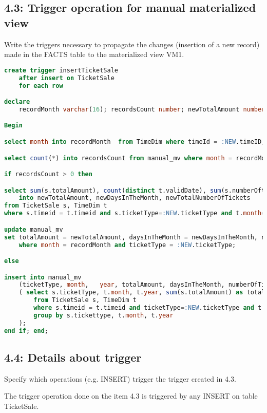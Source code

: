\subsection{4.3: Trigger operation for manual materialized view}
\begin{question}
    Write the triggers necessary to propagate the changes (insertion of a new record)
made in the FACTS table to the materialized view VM1.
\end{question}
\begin{answer}
    \begin{lstlisting}[language = SQL]
create trigger insertTicketSale
    after insert on TicketSale
    for each row

declare
    recordMonth varchar(16); recordsCount number; newTotalAmount number; newDaysInTheMonth number; newTotalNumberOfTickets number;

Begin

select month into recordMonth  from TimeDim where timeId = :NEW.timeID;

select count(*) into recordsCount from manual_mv where month = recordMonth and ticketType = :NEW.ticketType;

if recordsCount > 0 then

select sum(s.totalAmount), count(distinct t.validDate), sum(s.numberOftickets)
    into newTotalAmount, newDaysInTheMonth, newTotalNumberOfTickets
from TicketSale s, TimeDim t
where s.timeid = t.timeid and s.ticketType=:NEW.ticketType and t.month=recordMonth;

update manual_mv
set totalAmount = newTotalAmount, daysInTheMonth = newDaysInTheMonth, numberOfTickets = newTotalNumberOfTickets
    where month = recordMonth and ticketType = :NEW.ticketType;

else

insert into manual_mv
    (ticketType, month,   year, totalAmount, daysInTheMonth, numberOfTickets)
    ( select s.ticketType, t.month, t.year, sum(s.totalAmount) as totalAmount, count(distinct t.validDate) as daysInTheMonth, sum(s.numberOftickets) as numberOfTickets
        from TicketSale s, TimeDim t
        where s.timeid = t.timeid and ticketType=:NEW.ticketType and t.month=recordMonth
        group by s.tickettype, t.month, t.year
    );
end if; end;
    \end{lstlisting}
\end{answer}
\subsection{4.4: Details about trigger}
\begin{question}
     Specify which operations (e.g. INSERT) trigger the trigger created in 4.3.
\end{question}

\begin{answer}
    The trigger operation done on the item 4.3 is triggered by any INSERT on table TicketSale.
\end{answer}

